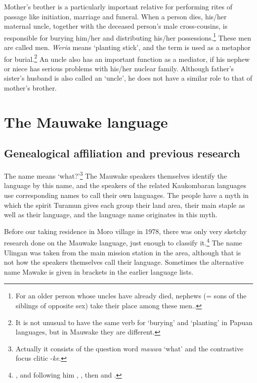 Mother's brother is a particularly important relative for performing rites of passage like initiation, marriage and funeral. When a person dies, his/her maternal uncle, together with the deceased person's male cross-cousins, is responsible for burying him/her and distributing his/her possessions.\footnote{For an older person whose uncles have already died, nephews (= sons of the siblings of opposite sex) take their place among these men..} These men are called  men.  \textit{Weria} means `planting stick', and the term is used as a metaphor for burial.\footnote{It is not unusual to have the same verb for `burying' and `planting' in Papuan languages, but in Mauwake they are different.} An uncle also has an important function as a mediator, if his nephew or niece has serious problems with his/her nuclear family. Although father's sister's husband is also called an `uncle', he does not have a similar role to that of mother's brother.  

\section{The Mauwake language}
\subsection{Genealogical affiliation and previous research}\label{sec:1.4.1}
The name  means `what?'\footnote{Actually it consists of the question word \textit{mauwa} `what' and the contrastive focus clitic -\textit{ke}.}  The Mauwake speakers themselves identify the language by this name, and the speakers of the related Kaukombaran languages use corresponding names to call their own languages.  The people have a myth in which the spirit Turamun gives each group their land area, their main staple as well as their language, and the language name originates in this myth.

Before our taking residence in Moro village in 1978, there was only very sketchy research done on the Mauwake language, just enough to classify it.\footnote{\citet{Capell1952}, and following him \citet{VoegelinEtAl1965}, \citet{Greenberg1971}, then \citet{ZGraggen1971,ZGraggen1975a} and \citet{Wurm1975,Wurm1982}.} The name Ulingan was taken from the main mission station in the area, although that is not how the speakers themselves call their language. Sometimes the alternative name Mawake is given in brackets in the earlier language lists.  

